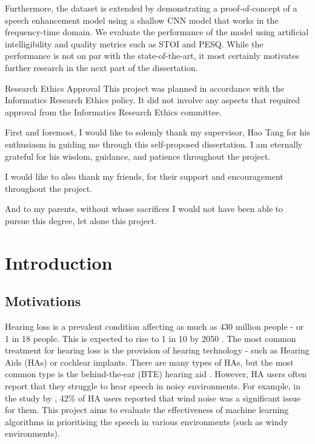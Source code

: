 \documentclass[logo,bsc,singlespacing,parskip,online]{infthesis}
\begin{document}
\begin{preliminary}
{   Furthermore, the dataset is extended by demonstrating a proof-of-concept of a speech enhancement model 
   using a shallow CNN model that works in the frequency-time domain. We evaluate the performance of the model 
   using artificial intelligibility and quality metrics such as STOI and PESQ. While the performance is not on par 
   with the state-of-the-art, it most certainly motivates further research in the next part of the dissertation.
}

\maketitle

\newenvironment{ethics}
   {\begin{frontenv}{Research Ethics Approval}{\LARGE}}
   {\end{frontenv}\newpage}

\begin{ethics}
This project was planned in accordance with the Informatics Research
Ethics policy. It did not involve any aspects that required approval
from the Informatics Research Ethics committee.

\standarddeclaration
\end{ethics}


\begin{acknowledgements}
First and foremost, I would like to solemly thank my supervisor, Hao Tang for 
his enthusiasm in guiding me through this self-proposed dissertation. I am eternally grateful for his wisdom, guidance, and patience throughout the project.

I would like to also thank my friends, for their support and encouragement throughout the project. 

And to my parents, without whose sacrifices I would not have been able to pursue this degree, let alone this project.
\end{acknowledgements}


\tableofcontents
\end{preliminary}


\chapter{Introduction}
\section{Motivations}
Hearing loss is a prevalent condition affecting as much as 
430 million people - or 1 in 18 people. This is expected 
to rise to 1 in 10 by 2050 \citep{WHO2024deafness}.
The most common treatment for hearing loss is the 
provision of hearing technology - such as Hearing Aids (HAs) or cochlear implants.
There are many types of HAs, but the most common
type is the behind-the-ear (BTE) hearing aid \citep{Kochkin2010MarkeTrak8}.
However, HA users often report that they struggle to hear speech
in noisy environments. For example, in the study by \citet{Kochkin2010MarkeTrak8},
42\% of HA users reported that wind noise was a significant issue for them.
This project aims to evaluate the effectiveness of machine learning algorithms
in prioritising the speech in various environments (such as windy environments).
\end{document}
